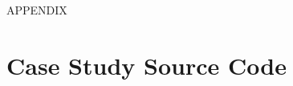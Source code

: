 \documentclass[SDSUThesis.tex]{subfiles}
\begin{document}
\newpage
\appendix
\label{appendix}
\begin{center}
APPENDIX\\
\end{center}




\section{Case Study Source Code} 
\label{app:case}
\end{document}
